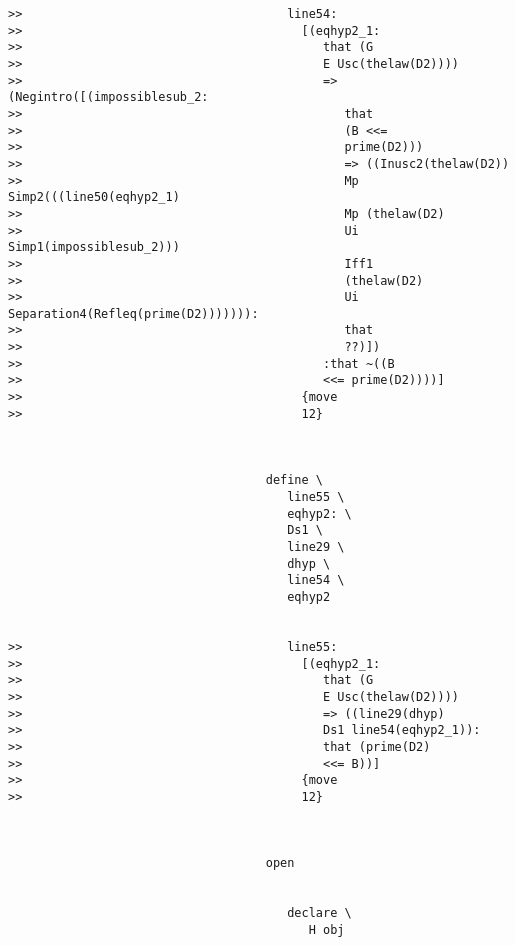 \documentclass[12pt]{article}
\begin{document}
\begin{verbatim}
>>                                     line54:
>>                                       [(eqhyp2_1:
>>                                          that (G
>>                                          E Usc(thelaw(D2))))
>>                                          => (Negintro([(impossiblesub_2:
>>                                             that
>>                                             (B <<=
>>                                             prime(D2)))
>>                                             => ((Inusc2(thelaw(D2))
>>                                             Mp Simp2(((line50(eqhyp2_1)
>>                                             Mp (thelaw(D2)
>>                                             Ui Simp1(impossiblesub_2)))
>>                                             Iff1
>>                                             (thelaw(D2)
>>                                             Ui Separation4(Refleq(prime(D2))))))):
>>                                             that
>>                                             ??)])
>>                                          :that ~((B
>>                                          <<= prime(D2))))]
>>                                       {move
>>                                       12}



                                    define \
                                       line55 \
                                       eqhyp2: \
                                       Ds1 \
                                       line29 \
                                       dhyp \
                                       line54 \
                                       eqhyp2


>>                                     line55:
>>                                       [(eqhyp2_1:
>>                                          that (G
>>                                          E Usc(thelaw(D2))))
>>                                          => ((line29(dhyp)
>>                                          Ds1 line54(eqhyp2_1)):
>>                                          that (prime(D2)
>>                                          <<= B))]
>>                                       {move
>>                                       12}



                                    open


                                       declare \
                                          H obj



\end{verbatim}
\end{document}
